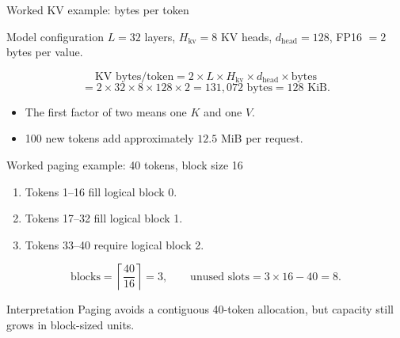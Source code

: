 \documentclass[aspectratio=169,11pt]{beamer}
\begin{document}
\begin{frame}{Worked KV example: bytes per token}
  \begin{block}{Model configuration}
    \(L=32\) layers, \(H_{\mathrm{kv}}=8\) KV heads,
    \(d_{\mathrm{head}}=128\), FP16 \(=2\) bytes per value.
  \end{block}
  \[
    \text{KV bytes/token}
    =2\times L\times H_{\mathrm{kv}}\times d_{\mathrm{head}}\times\text{bytes}
  \]
  \[
    =2\times32\times8\times128\times2
    =131{,}072\text{ bytes}
    =128\text{ KiB}.
  \]
  \begin{itemize}
    \item The first factor of two means one \(K\) and one \(V\).
    \item 100 new tokens add approximately \(12.5\) MiB per request.
  \end{itemize}
\end{frame}

\begin{frame}{Worked paging example: 40 tokens, block size 16}
  \begin{enumerate}
    \item Tokens 1--16 fill logical block 0.
    \item Tokens 17--32 fill logical block 1.
    \item Tokens 33--40 require logical block 2.
  \end{enumerate}
  \[
    \text{blocks}=\left\lceil\frac{40}{16}\right\rceil=3,
    \qquad
    \text{unused slots}=3\times16-40=8.
  \]
  \begin{block}{Interpretation}
    Paging avoids a contiguous 40-token allocation, but capacity still grows in block-sized units.
  \end{block}
\end{frame}
\end{document}
